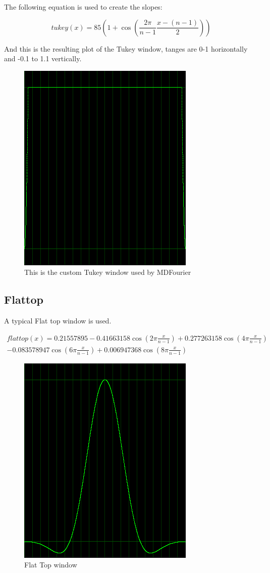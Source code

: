 \documentclass[10pt,a4paper]{report}
\begin{document}
The following equation is used to create the slopes:

\begin{equation}
tukey(x)=85(1+\cos(\frac{2\pi}{n-1}\frac{x-(n-1)}{2}))
\end{equation}

And this is the resulting plot of the Tukey window, tanges are 0-1 horizontally and -0.1 to 1.1 vertically.

\begin{figure}[H]
	\centering
	\includegraphics[width=0.4\linewidth]{plots/window-tukey.png}
	\caption[Tukey Window]{This is the custom Tukey window used by MDFourier}
	\label{fig:window-tukey}
\end{figure}


\subsection{Flattop}
A typical Flat top window is used.

\begin{align*}
flattop(x)=0.21557895 - 0.41663158\cos(2\pi\frac{x}{n-1})+ 0.277263158\cos(4\pi\frac{x}{n-1})\\
 - 0.083578947\cos(6\pi\frac{x}{n-1}) + 0.006947368\cos(8\pi\frac{x}{n-1})
\end{align*}

\begin{figure}[H]
	\centering
	\includegraphics[width=0.4\linewidth]{plots/window-flattop.png}
	\caption[Flat Top window]{Flat Top window}
	\label{fig:window-flattop}
\end{figure}
\end{document}
